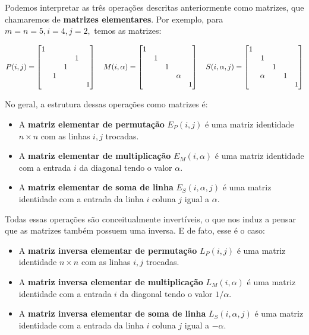 \documentclass[11pt, a4paper]{article}
\begin{document}
Podemos interpretar as três operações descritas anteriormente como matrizes, que chamaremos de \textbf{matrizes elementares}. Por exemplo, para \(m=n=5,i=4,j=2,\) temos as matrizes:

\void[-2]

\[
P(i,j)=
\begin{bmatrix}
    1&&&&\\
    &&&1&\\
    &&1&&\\
    &1&&&\\
    &&&&1\\
\end{bmatrix}
\tb[1]M(i,\alpha)=
\begin{bmatrix}
    1&&&&\\
    &1&&&\\
    &&1&&\\
    &&&\alpha&\\
    &&&&1\\
\end{bmatrix}
\tb[1]S(i,\alpha,j)=
\begin{bmatrix}
    1&&&&\\
    &1&&&\\
    &&1&&\\
    &\alpha&&1&\\
    &&&&1\\
\end{bmatrix}
\]

No geral, a estrutura dessas operações como matrizes é:

\begin{itemize}
    \item A \textbf{matriz elementar de permutação} \(E_P(i,j)\) é uma matriz identidade \(n\times n\) com as linhas \(i,j\) trocadas.
    \item A \textbf{matriz elementar de multiplicação} \(E_M(i,\alpha)\) é uma matriz identidade com a entrada \(i\) da diagonal tendo o valor \(\alpha\).
    \item A \textbf{matriz elementar de soma de linha} \(E_S(i,\alpha,j)\) é uma matriz identidade com a entrada da linha \(i\) coluna \(j\) igual a \(\alpha\).
\end{itemize}

Todas essas operações são conceitualmente invertíveis, o que nos induz a pensar que as matrizes também possuem uma inversa. E de fato, esse é o caso:

\begin{itemize}
    \item A \textbf{matriz inversa elementar de permutação} \(L_P(i,j)\) é uma matriz identidade \(n\times n\) com as linhas \(i,j\) trocadas.
    \item A \textbf{matriz inversa elementar de multiplicação} \(L_M(i,\alpha)\) é uma matriz identidade com a entrada \(i\) da diagonal tendo o valor \(1/\alpha\).
    \item A \textbf{matriz inversa elementar de soma de linha} \(L_S(i,\alpha,j)\) é uma matriz identidade com a entrada da linha \(i\) coluna \(j\) igual a \(-\alpha\).
\end{itemize}
\end{document}
